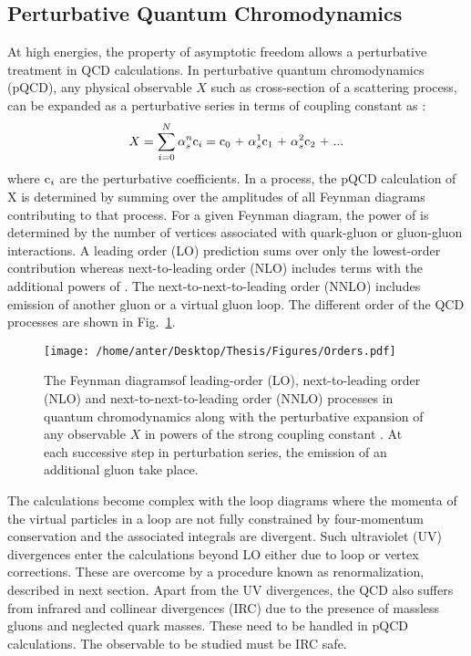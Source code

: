 \subsection{Perturbative Quantum Chromodynamics}
At high energies, the property of asymptotic freedom allows a perturbative treatment in QCD calculations. In perturbative quantum chromodynamics (pQCD), any physical observable $X$ such as cross-section of a scattering process, can be expanded as a perturbative series in terms of coupling constant \alps as : 
\begin{equation}
\label{eq:pertur}
X = \sum\limits_{i=0}^{N} \alpha^n_s {\rm c}_i = {\rm c}_0~\plus \alpha^1_s {\rm c}_1~\plus \alpha^2_s {\rm c}_2~\plus ...
\end{equation} 
where ${\rm c}_i$ are the perturbative coefficients. In a process, the pQCD calculation of X is determined by summing over the amplitudes of all Feynman diagrams contributing to that process. For a given Feynman diagram, the power of \alps is determined by the number of vertices associated with quark-gluon or gluon-gluon interactions. A leading order (LO) prediction sums over only the lowest-order contribution whereas next-to-leading order (NLO) includes terms with the additional powers of \alps. The next-to-next-to-leading order (NNLO) includes emission of another gluon or a virtual gluon loop. The different order of the QCD processes are shown in Fig.~\ref{fig:orders}.
\begin{figure}[!h]
\begin{center}
\hspace*{-1mm}
\texttt{[image: /home/anter/Desktop/Thesis/Figures/Orders.pdf]}\\
\vspace*{4mm}
\caption[The Feynman diagrams of leading-order (LO), next-to-leading order (NLO) and next-to-next-to-leading order (NNLO) processes in quantum chromodynamics.]{The Feynman diagrams\footnotemark of leading-order (LO), next-to-leading order (NLO) and next-to-next-to-leading order (NNLO) processes in quantum chromodynamics along with the perturbative expansion of any observable $X$ in powers of the strong coupling constant \alps. At each successive step in perturbation series, the emission of an additional gluon take place.}
\label{fig:orders}
\end{center}
\end{figure}
The calculations become complex with the loop diagrams where the momenta of the virtual particles in a loop are not fully constrained by four-momentum conservation and the associated integrals are divergent. Such ultraviolet (UV) divergences enter the calculations beyond LO either due to loop or vertex corrections. These are overcome by a procedure known as renormalization, described in next section. Apart from the UV divergences, the QCD also suffers from infrared and collinear divergences (IRC) due to the presence of massless gluons and neglected quark masses. These need to be handled in pQCD calculations. The observable to be studied must be IRC safe. 

